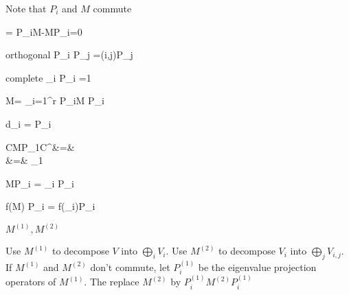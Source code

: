 Note that
$P_i$ and $M$
commute

\beq
[P_i, M]=
P_iM-MP_i=0
\eeq

orthogonal
\beq
P_i P_j =\delta(i,j)P_j
\eeq

complete
\beq
\sum_i P_i =1
\eeq

\beq
M= \sum_{i=1}^r
P_iM P_i
\eeq

\beq
d_i = \tr P_i
\eeq

\beqa
CMP_1C^\dagger &=&
\left[
\begin{array}{cc}
1&0
\\
0&0
\end{array}
\right] 
\\
&=&
\lam_1
\left[
\begin{array}{cc}
1&0
\\
0&0
\end{array}
\right] 
\eeqa

\beq
MP_i = \lam_i P_i \;
\eeq

\beq
f(M) P_i = f(\lam_i)P_i \;
\eeq

$M^{(1)}, M^{(2)}$

\eeq
Use $M^{(1)}$ to decompose $V$
into $\bigoplus_i V_i$.
Use  $M^{(2)}$ to decompose $V_i$ into
$\bigoplus_j V_{i,j}$. 
If $M^{(1)}$ and $M^{(2)}$ don't
commute, let $P^{(1)}_i$ be the eigenvalue 
projection operators of $M^{(1)}$. The replace $M^{(2)}$ by $P^{(1)}_i M^{(2)}P_i^{(1)}$

\eeq



